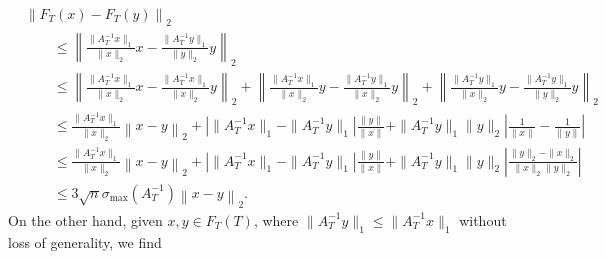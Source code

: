 \documentclass[a4paper]{article}
\begin{document}
        \begin{align*}
            &
            \left\| F_T(x) - F_T(y) \right\|_{2}
            \\&\qquad 
            \leq 
            \left\| 
                \frac{ \| A_{T}^{-1} x \|_{1} }{ \|x\|_2 } x - \frac{ \| A_{T}^{-1} y \|_{1} }{ \|y\|_2 } y
            \right\|_{2}
            \\&\qquad 
            \leq 
            \left\| 
                \frac{ \| A_{T}^{-1} x \|_{1} }{ \|x\|_2 } x - \frac{ \| A_{T}^{-1} x \|_{1} }{ \|x\|_2 } y
            \right\|_{2}
            +
            \left\| 
                \frac{ \| A_{T}^{-1} x \|_{1} }{ \|x\|_2 } y - \frac{ \| A_{T}^{-1} y \|_{1} }{ \|x\|_2 } y
            \right\|_{2}
            +
            \left\| 
                \frac{ \| A_{T}^{-1} y \|_{1} }{ \|x\|_2 } y - \frac{ \| A_{T}^{-1} y \|_{1} }{ \|y\|_2 } y
            \right\|_{2}
            \\&\qquad 
            \leq 
            \frac{ \| A_{T}^{-1} x \|_{1} }{ \|x\|_2 } 
            \left\| 
                x - y
            \right\|_{2}
            +
            \left| \|A_{T}^{-1} x\|_1 - \|A_{T}^{-1} y\|_1 \right|
            \frac{\|y\|}{\|x\|}
            +
            \|A_{T}^{-1} y\|_1 \|y\|_{2}
            \left| \frac{1}{\|x\|} - \frac{1}{\|y\|} \right|
            \\&\qquad 
            \leq 
            \frac{ \| A_{T}^{-1} x \|_{1} }{ \|x\|_2 } 
            \left\| 
                x - y
            \right\|_{2}
            +
            \left| \|A_{T}^{-1} x\|_1 - \|A_{T}^{-1} y\|_1 \right|
            \frac{\|y\|}{\|x\|}
            +
            \|A_{T}^{-1} y\|_1 \|y\|_{2}
            \left| \frac{ \|y\|_{2} - \|x\|_{2} }{\|x\|_{2} \|y\|_{2}} \right|
            \\&\qquad 
            \leq 
            3 \sqrt{n} \sigma_{\max}(A_{T}^{-1}) 
            \left\| x - y \right\|_{2}
            .
        \end{align*}
        On the other hand, given $x, y \in F_T(T)$, 
        where $\| A_{T}^{-1} y \|_{1} \leq \| A_{T}^{-1} x \|_{1}$ without loss of generality, we find 
\end{document}

